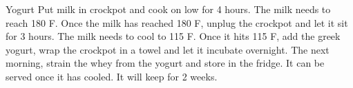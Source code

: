 \documentclass[../cookbook.tex]{subfiles}
\begin{document}
\begin{recipe}{Yogurt}{}{}
    Put milk in crockpot and cook on low for 4 hours. The milk needs to reach
    180 \degrees{}F. Once the milk has reached 180 \degrees{}F, unplug the
    crockpot and let it sit for 3 hours. The milk needs to cool to 115
    \degrees{}F.
    Once it hits 115 \degrees{}F, add the greek yogurt, wrap the crockpot in a
    towel and let it incubate overnight. The next morning, strain the whey from
    the yogurt and store in the fridge. It can be served once it has cooled. It
    will keep for 2 weeks.

\end{recipe}
\end{document}
